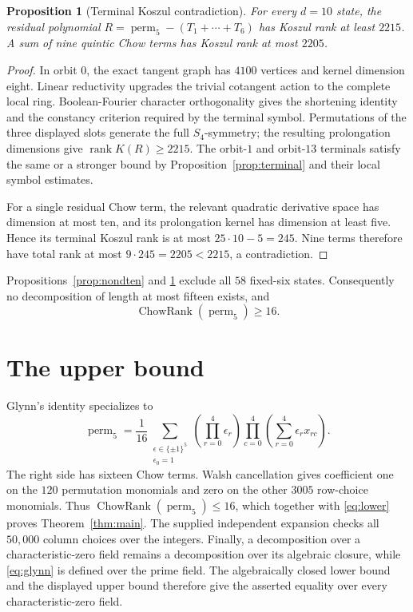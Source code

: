 \documentclass[11pt,reqno]{amsart}
\newtheorem{proposition}[theorem]{Proposition}
\theoremstyle{definition}
\newcommand{\rank}{\operatorname{rank}}
\newcommand{\ChowRank}{\operatorname{ChowRank}}
\newcommand{\perm}{\operatorname{perm}}
\begin{document}
\begin{proposition}[Terminal Koszul contradiction]\label{prop:terminalrank}
For every \(d=10\) state, the residual polynomial
\(R=\perm_5-(T_1+\cdots+T_6)\) has Koszul rank at least \(2215\). A sum of
nine quintic Chow terms has Koszul rank at most \(2205\).
\end{proposition}

\begin{proof}
In orbit \(0\), the exact tangent graph has \(4100\) vertices and kernel
dimension eight. Linear reductivity upgrades the trivial cotangent action to
the complete local ring. Boolean-Fourier character orthogonality gives the
shortening identity and the constancy criterion required by the terminal
symbol. Permutations of the three displayed slots generate the full
\(S_4\)-symmetry; the resulting prolongation dimensions give
\(\rank K(R)\ge2215\). The orbit-\(1\) and orbit-\(13\) terminals satisfy the
same or a stronger bound by Proposition~\ref{prop:terminal} and their local
symbol estimates.

For a single residual Chow term, the relevant quadratic derivative space has
dimension at most ten, and its prolongation kernel has dimension at least five.
Hence its terminal Koszul rank is at most \(25\cdot10-5=245\). Nine terms
therefore have total rank at most \(9\cdot245=2205<2215\), a contradiction.
\end{proof}

Propositions~\ref{prop:nondten} and \ref{prop:terminalrank} exclude all
\(58\) fixed-six states. Consequently no decomposition of length at most
fifteen exists, and
\begin{equation}\label{eq:lower}
 \ChowRank(\perm_5)\ge16.
\end{equation}

\section{The upper bound}\label{sec:upper}

Glynn's identity \cite{Glynn2010} specializes to
\begin{equation}\label{eq:glynn}
 \perm_5=\frac1{16}
 \sum_{\substack{\epsilon\in\{\pm1\}^5\\ \epsilon_0=1}}
 \left(\prod_{r=0}^4\epsilon_r\right)
 \prod_{c=0}^4\left(\sum_{r=0}^4\epsilon_rx_{rc}\right).
\end{equation}
The right side has sixteen Chow terms. Walsh cancellation gives coefficient
one on the \(120\) permutation monomials and zero on the other \(3005\)
row-choice monomials. Thus \(\ChowRank(\perm_5)\le16\), which together with
\eqref{eq:lower} proves Theorem~\ref{thm:main}. The supplied independent
expansion checks all \(50{,}000\) column choices over the integers. Finally,
a decomposition over a characteristic-zero field remains a decomposition over
its algebraic closure, while \eqref{eq:glynn} is defined over the prime field.
The algebraically closed lower bound and the displayed upper bound therefore
give the asserted equality over every characteristic-zero field.
\end{document}
